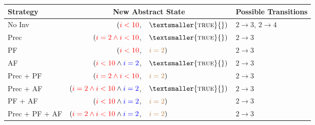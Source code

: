 \documentclass[10pt]{standalone}
\newcommand{\true}{\textsmaller{\textsc{true}}}
\begin{document}
 \begin{tabular}{lrll}
  Strategy & \multicolumn{2}{c}{New Abstract State} & Possible Transitions\\
  \midrule
  No Inv& $(\textcolor{red}{i < 10}$,& $\text{\true{}})$ & $2 \rightarrow 3$, $2 \rightarrow 4$\\
  Prec & $(\textcolor{red}{i = 2 \land i < 10}$,& $\text{\true{}})$ & $2 \rightarrow 3$\\
  PF & $(\textcolor{red}{i < 10}$,& $\textcolor{brown}{i = 2})$ & $2 \rightarrow 3$\\
  AF & $(\textcolor{red}{i < 10} \land \textcolor{blue}{i = 2}$,& $\text{\true{}})$ & $2 \rightarrow 3$\\
  Prec + PF & $(\textcolor{red}{i = 2 \land i < 10}$,& $\textcolor{brown}{i = 2})$ & $2 \rightarrow 3$\\
  Prec + AF & $(\textcolor{red}{i = 2 \land i < 10} \land \textcolor{blue}{i = 2}$,& $\text{\true{}})$ & $2 \rightarrow 3$\\
  PF + AF & $(\textcolor{red}{i < 10} \land \textcolor{blue}{i = 2}$,& $\textcolor{brown}{i = 2})$ & $2 \rightarrow 3$\\
  Prec + PF + AF & $(\textcolor{red}{i = 2 \land i < 10} \land \textcolor{blue}{i = 2}$,& $\textcolor{brown}{i = 2})$ & $2 \rightarrow 3$\\

 \end{tabular}
\end{document}
